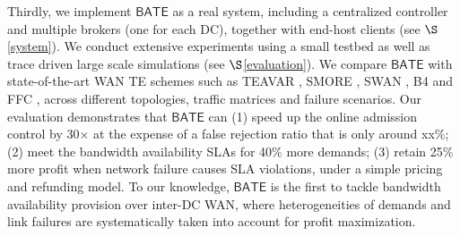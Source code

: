 \documentclass[sigconf]{acmart}
\begin{document}
Thirdly, 
we implement $\mathsf{BATE}$ as a real system, including a centralized controller and multiple brokers (one for each DC),  together with end-host clients (see $\S$\ref{system}).
 We conduct extensive experiments using a small testbed as well as trace driven large scale simulations (see $\S$\ref{evaluation}).
We compare  $\mathsf{BATE}$ with state-of-the-art WAN TE schemes such as TEAVAR \cite{Teavar}, SMORE \cite{SMORE}, SWAN \cite{swan}, B4 \cite{B4} and FFC \cite{FFC}, across different topologies, traffic matrices and failure scenarios.
Our evaluation demonstrates that $\mathsf{BATE}$ can 
(1) speed up the online admission control by 30$\times $ at the expense of a false rejection ratio that is only around xx\%;
(2) meet the bandwidth availability SLAs for 40\% more demands;
(3) retain 25\% more profit when network failure causes SLA violations, under a simple pricing and refunding model. 
To our knowledge, $\mathsf{BATE}$ is the first to tackle bandwidth availability provision over inter-DC WAN, where heterogeneities of demands and link failures are systematically taken into account for profit maximization.  

%
\end{document}
